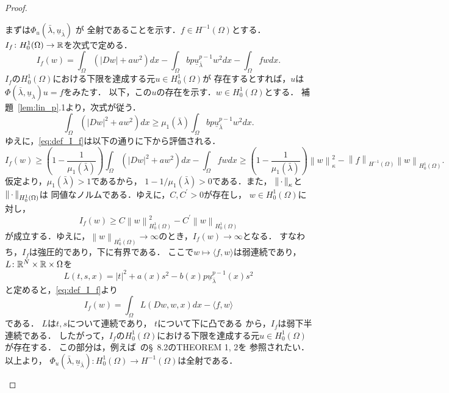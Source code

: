 \begin{proof}
\begin{enumerate}[1.]
        まずは$\Phi_u (\bar{\lambda}, \underline{u}_{\bar{\lambda}})$
        が
        全射であることを示す．$f \in H^{-1}(\Omega)$とする．
        $I_f \colon H_0^1(\Omega) \to \mathbb{R}$を次式で定める．
        \begin{equation}
         I_f (w) = \int_\Omega \left( \lvert Dw \rvert + aw^2 \right)
          dx - \int_\Omega bp \underline{u}_{\bar{\lambda}}^{p-1} w^2
          dx - \int_\Omega fw dx. \label{eq:def_I_f}
        \end{equation}
        $I_f$の$H_0^1(\Omega)$における下限を達成する元$u \in
        H_0^1(\Omega)$が
        存在するとすれば，$u$は$\Phi(\bar{\lambda},
        \underline{u}_\lambda)u = f$をみたす．
        以下，この$u$の存在を示す．$w \in H_0^1(\Omega)$とする．
        補題~\ref{lem:lin_p}.1より，次式が従う．
        \begin{equation}
         \int_\Omega \left( \lvert Dw \rvert^2 + aw^2 \right) dx \geq
          \mu_1(\bar{\lambda}) \int_\Omega bp
          \underline{u}_{\bar{\lambda}}^{p-1} w^2 dx.
          \label{eq:mu_1_bar_lambda_r} 
        \end{equation}
        ゆえに，\eqref{eq:def_I_f}は以下の通りに下から評価される．
        \[
         I_f(w) \geq \left( 1 - \frac{1}{\mu_1(\bar{\lambda})} \right)
        \int_\Omega \left( \lvert Dw \rvert^2 + aw^2\right) dx -
        \int_\Omega fw dx \geq \left( 1 -
        \frac{1}{\mu_1(\bar{\lambda})} \right) \left\| w
        \right\|_\kappa^2 - \left\| f \right\|_{H^{-1}(\Omega)}
        \left\| w \right\|_{H_0^1(\Omega)}.
        \]
        仮定より，$\mu_1(\bar{\lambda}) > 1$であるから，
        $1 - 1/\mu_1(\bar{\lambda}) > 0$である．また，
        $\left\|\, \cdot \, \right\|_\kappa$と$\left\|\, \cdot \, \right\|_{H_0^1(\Omega)}$は
        同値なノルムである．ゆえに，$C, C^\prime > 0$が存在し，
        $w \in H_0^1(\Omega)$に対し，
        \[
         I_f (w) \geq C \left\| w \right\|^2_{H_0^1(\Omega)} -
          C^\prime \left\| w \right\|_{H_0^1(\Omega)}          
        \]
        が成立する．ゆえに，$\left\| w \right\|_{H_0^1(\Omega)} \to
        \infty$のとき，$I_f(w) \to \infty$となる．
        すなわち，$I_f$は強圧的であり，下に有界である．
        ここで$w \mapsto \langle f, w \rangle$は弱連続であり，
        $L \colon \mathbb{R}^N \times \mathbb{R} \times \Omega$を
        \[
         L(t, s, x) = \lvert t \rvert^2 + a(x)s^2 - b(x)p
        \underline{u}_{\bar{\lambda}}^{p-1}(x) s^2
        \]
        と定めると，\eqref{eq:def_I_f}より
        \[
         I_f (w) = \int_\Omega L(Dw, w, x) dx - \langle f , w \rangle
        \]
        である．
        $L$は$t, s$について連続であり，
        $t$について下に凸である
        から，$I_f$は弱下半連続である．
        したがって，$I_f$の$H_0^1(\Omega)$における下限を達成する元$u
        \in H_0^1(\Omega)$が存在する．
        この部分は，例えば~\cite{MR2597943}の\S~8.2のTHEOREM 1, 2を
        参照されたい．以上より，
        $\Phi_u (\bar{\lambda}, \underline{u}_{\bar{\lambda}}) \colon
        H_0^1(\Omega) \to H^{-1}(\Omega)$は全射である．
        

\end{enumerate}
\end{proof}
